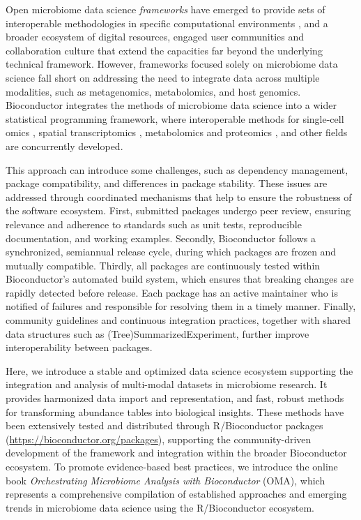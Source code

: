 \documentclass[
  sn-nature,
]{sn-jnl}
\begin{document}
Open microbiome data science \emph{frameworks} have emerged to provide
sets of interoperable methodologies in specific computational
environments \citep{eren2021, schloss2009, bolyen2019, mcmurdie2012},
and a broader ecosystem of digital resources, engaged user communities
and collaboration culture that extend the capacities far beyond the
underlying technical framework. However, frameworks focused solely on
microbiome data science fall short on addressing the need to integrate
data across multiple modalities, such as metagenomics, metabolomics, and
host genomics. Bioconductor integrates the methods of microbiome data
science into a wider statistical programming framework, where
interoperable methods for single-cell omics \citep{amezquita2020},
spatial transcriptomics \citep{crowell2025}, metabolomics and proteomics
\citep{anwar2025}, and other fields are concurrently developed.

This approach can introduce some challenges, such as dependency
management, package compatibility, and differences in package stability.
These issues are addressed through coordinated mechanisms that help to
ensure the robustness of the software ecosystem. First, submitted
packages undergo peer review, ensuring relevance and adherence to
standards such as unit tests, reproducible documentation, and working
examples. Secondly, Bioconductor follows a synchronized, semiannual
release cycle, during which packages are frozen and mutually compatible.
Thirdly, all packages are continuously tested within Bioconductor's
automated build system, which ensures that breaking changes are rapidly
detected before release. Each package has an active maintainer who is
notified of failures and responsible for resolving them in a timely
manner. Finally, community guidelines and continuous integration
practices, together with shared data structures such as
(Tree)SummarizedExperiment, further improve interoperability between
packages.

Here, we introduce a stable and optimized data science ecosystem
supporting the integration and analysis of multi-modal datasets in
microbiome research. It provides harmonized data import and
representation, and fast, robust methods for transforming abundance
tables into biological insights. These methods have been extensively
tested and distributed through R/Bioconductor packages
(\url{https://bioconductor.org/packages}), supporting the
community-driven development of the framework and integration within the
broader Bioconductor ecosystem. To promote evidence-based best
practices, we introduce the online book \emph{Orchestrating Microbiome
Analysis with Bioconductor} (OMA), which represents a comprehensive
compilation of established approaches and emerging trends in microbiome
data science using the R/Bioconductor ecosystem.
\end{document}
